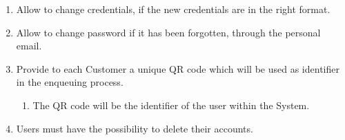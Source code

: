 \documentclass[a4paper, 10pt, oneside]{article}
\newcommand*{\lorenzo}[1]{\textcolor{BurntOrange}{#1}}
\begin{document}
\begin{enumerate}[align=left, label={R.\arabic{*}}]
\begin{enumerate}[label={-}]
    \end{enumerate}
    \item \label{req:changeCredentials} Allow to change credentials, if the new credentials are in the right format.
    \item \label{req:changePassWithMail}Allow to change password if it has been forgotten, through the personal email.
    \item \label{req:provideQR} Provide to each Customer a unique QR code \lorenzo{which will be used as identifier in the enqueuing process}.
    \begin{enumerate}[label={-}]
        \item \label{req:provideQR:uniqueID} The QR code will be the identifier of the user within the System.
    \end{enumerate}
    \item \label{req:deleteAccount} Users must have the possibility to delete their accounts.
    

\end{enumerate}
\end{document}
